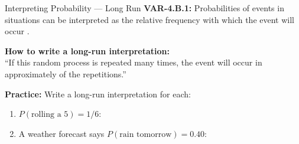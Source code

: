 \documentclass[10pt]{article}
\begin{document}
\vspace{0.1in}

\begin{notesbox}{Interpreting Probability --- Long Run}
\small
\textbf{VAR-4.B.1:} Probabilities of events in \blank{4cm} situations can be
interpreted as the relative frequency with which the event will occur \blank{4cm}.

\vspace{8pt}
\textbf{How to write a long-run interpretation:}\\
``If this random process is repeated many times, the event \blank{4cm} will occur in
approximately \blank{3cm} of the repetitions.''

\vspace{10pt}
\textbf{Practice:} Write a long-run interpretation for each:
\begin{enumerate}[leftmargin=1.5em, itemsep=10pt]
  \item $P(\text{rolling a 5}) = 1/6$:\\
        \writeline
  \item A weather forecast says $P(\text{rain tomorrow}) = 0.40$:\\
        \writeline
\end{enumerate}
\end{notesbox}

\vspace{0.1in}
\end{document}
